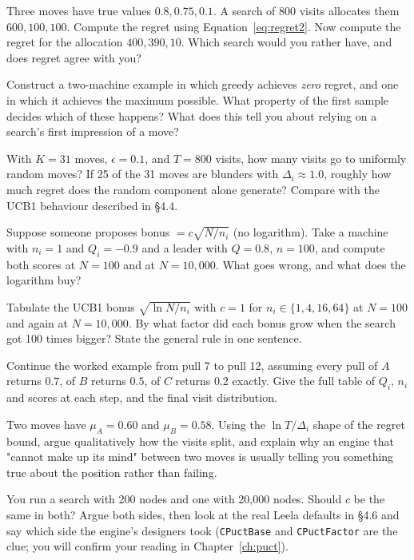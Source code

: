 \begin{exercises}

 Three moves have true values $0.8, 0.75, 0.1$. A search of 800
visits allocates them $600, 100, 100$. Compute the regret using Equation~\eqref{eq:regret2}.
Now compute the regret for the allocation $400, 390, 10$. Which search would you rather have,
and does regret agree with you?

 Construct a two-machine example in which greedy achieves
\emph{zero} regret, and one in which it achieves the maximum possible. What property of the
first sample decides which of these happens? What does this tell you about relying on a
search's first impression of a move?

 With $K = 31$ moves, $\epsilon = 0.1$, and
$T = 800$ visits, how many visits go to uniformly random moves? If 25 of the 31 moves are
blunders with $\Delta_i \approx 1.0$, roughly how much regret does the random component alone
generate? Compare with the UCB1 behaviour described in §4.4.

 Suppose someone proposes bonus
$= c\sqrt{N/n_i}$ (no logarithm). Take a machine with $n_i = 1$ and $Q_i = -0.9$ and a leader
with $Q = 0.8$, $n = 100$, and compute both scores at $N = 100$ and at $N = 10{,}000$. What
goes wrong, and what does the logarithm buy?

 Tabulate the UCB1 bonus $\sqrt{\ln N / n_i}$ with $c=1$
for $n_i \in \{1, 4, 16, 64\}$ at $N = 100$ and again at $N = 10{,}000$. By what factor did
each bonus grow when the search got 100 times bigger? State the general rule in one sentence.

 Continue the worked example from pull 7 to pull
12, assuming every pull of $A$ returns $0.7$, of $B$ returns $0.5$, of $C$ returns $0.2$
exactly. Give the full table of $Q_i$, $n_i$ and scores at each step, and the final visit
distribution.

 Two moves have $\mu_A = 0.60$ and $\mu_B = 0.58$.
Using the $\ln T/\Delta_i$ shape of the regret bound, argue qualitatively how the visits
split, and explain why an engine that "cannot make up its mind" between two moves is
usually telling you something true about the position rather than failing.

 You run a search with 200 nodes and one with 20{,}000
nodes. Should $c$ be the same in both? Argue both sides, then look at the real Leela defaults
in §4.6 and say which side the engine's designers took (\texttt{CPuctBase} and
\texttt{CPuctFactor} are the clue; you will confirm your reading in Chapter~\ref{ch:puct}).


\end{exercises}
